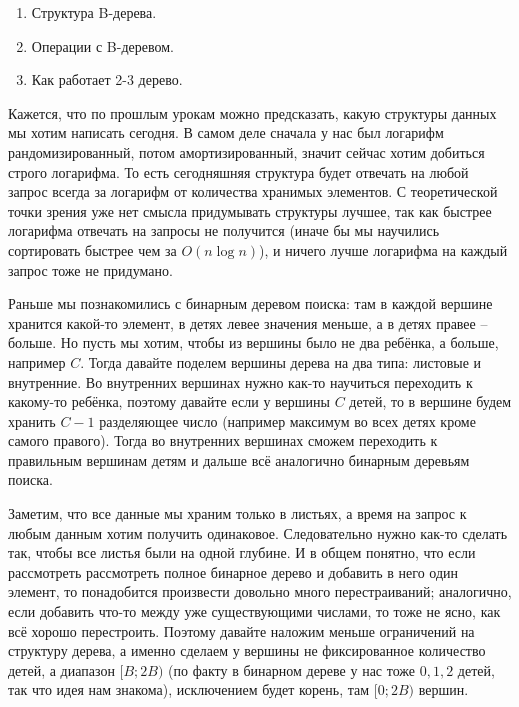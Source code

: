 \label{md2tex11}
\hyperref[md2texREADME]{\color{cyan}{К главному описанию}}


\begin{enumerate}
    \item Структура B-дерева.
    \item Операции с B-деревом.
    \item Как работает 2-3 дерево.
\end{enumerate}


Кажется, что по прошлым урокам можно предсказать, какую структуры данных мы хотим написать сегодня. В самом деле сначала у нас был логарифм рандомизированный, потом амортизированный, значит сейчас хотим добиться строго логарифма. То есть сегодняшняя структура будет отвечать на любой запрос всегда за логарифм от количества хранимых элементов. С теоретической точки зрения уже нет смысла придумывать структуры лучшее, так как быстрее логарифма отвечать на запросы не получится (иначе бы мы научились сортировать быстрее чем за $O(n \log n)$), и ничего лучше логарифма на каждый запрос тоже не придумано.


Раньше мы познакомились с бинарным деревом поиска: там в каждой вершине хранится какой-то элемент, в детях левее значения меньше, а в детях правее -- больше. Но пусть мы хотим, чтобы из вершины было не два ребёнка, а больше, например $C$. Тогда давайте поделем вершины дерева на два типа: листовые и внутренние. Во внутренних вершинах нужно как-то научиться переходить к какому-то ребёнка, поэтому давайте если у вершины $C$ детей, то в вершине будем хранить $C - 1$ разделяющее число (например максимум во всех детях кроме самого правого). Тогда во внутренних вершинах сможем переходить к правильным вершинам детям и дальше всё аналогично бинарным деревьям поиска.

Заметим, что все данные мы храним только в листьях, а время на запрос к любым данным хотим получить одинаковое. Следовательно нужно как-то сделать так, чтобы все листья были на одной глубине. И в общем понятно, что если рассмотреть рассмотреть полное бинарное дерево и добавить в него один элемент, то понадобится произвести довольно много перестраиваний; аналогично, если добавить что-то между уже существующими числами, то тоже не ясно, как всё хорошо перестроить. Поэтому давайте наложим меньше ограничений на структуру дерева, а именно сделаем у вершины не фиксированное количество детей, а диапазон $[B; 2B)$ (по факту в бинарном дереве у нас тоже $0, 1, 2$ детей, так что идея нам знакома), исключением будет корень, там $[0; 2B)$ вершин.


